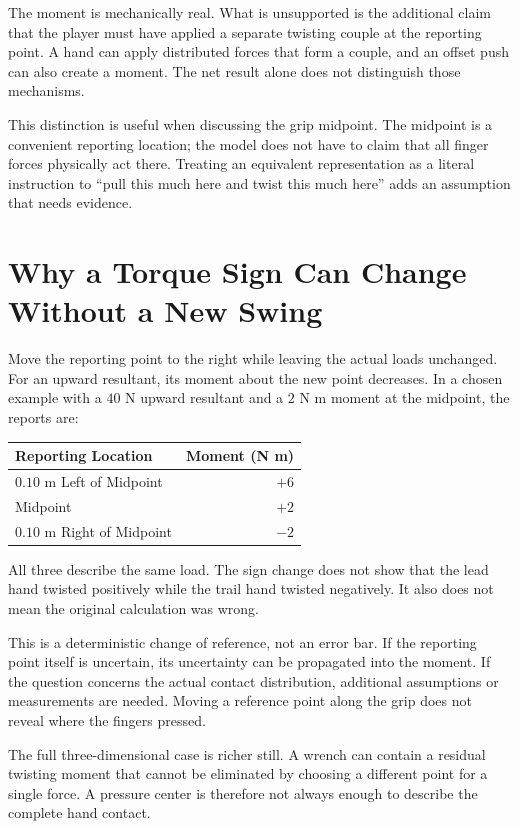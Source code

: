 \documentclass[11pt,a4paper]{article}
\begin{document}
The moment is mechanically real. What is unsupported is the additional claim that the player must have applied a separate twisting couple at the reporting point. A hand can apply distributed forces that form a couple, and an offset push can also create a moment. The net result alone does not distinguish those mechanisms.

This distinction is useful when discussing the grip midpoint. The midpoint is a convenient reporting location; the model does not have to claim that all finger forces physically act there. Treating an equivalent representation as a literal instruction to ``pull this much here and twist this much here'' adds an assumption that needs evidence.

\section{Why a Torque Sign Can Change Without a New Swing}
Move the reporting point to the right while leaving the actual loads unchanged. For an upward resultant, its moment about the new point decreases. In a chosen example with a $40$ N upward resultant and a $2$ N m moment at the midpoint, the reports are:
\begin{center}\begin{tabular}{lr}\toprule
Reporting Location & Moment (N m)\\\midrule
$0.10$ m Left of Midpoint & $+6$\\
Midpoint & $+2$\\
$0.10$ m Right of Midpoint & $-2$\\\bottomrule
\end{tabular}\end{center}
All three describe the same load. The sign change does not show that the lead hand twisted positively while the trail hand twisted negatively. It also does not mean the original calculation was wrong.

This is a deterministic change of reference, not an error bar. If the reporting point itself is uncertain, its uncertainty can be propagated into the moment. If the question concerns the actual contact distribution, additional assumptions or measurements are needed. Moving a reference point along the grip does not reveal where the fingers pressed.

The full three-dimensional case is richer still. A wrench can contain a residual twisting moment that cannot be eliminated by choosing a different point for a single force. A pressure center is therefore not always enough to describe the complete hand contact.
\end{document}
